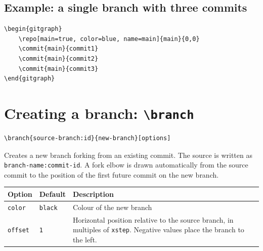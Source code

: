 \documentclass{article}
\newcommand{\cmd}[1]{\texttt{\textbackslash#1}}
\newcommand{\opt}[1]{\texttt{#1}}
\begin{document}
        \subsection{Example: a single branch with three commits}

            \begin{verbatim}
\begin{gitgraph}
    \repo[main=true, color=blue, name=main]{main}{0,0}
    \commit{main}{commit1}
    \commit{main}{commit2}
    \commit{main}{commit3}
\end{gitgraph}
            \end{verbatim}

            \begin{center}
                \begin{gitgraph}
                \end{gitgraph}
            \end{center}

    \section{Creating a branch: \cmd{branch}}

        \begin{verbatim}
\branch{source-branch:id}{new-branch}[options]
        \end{verbatim}

        Creates a new branch forking from an existing commit.
        The source is written as \texttt{branch-name:commit-id}.
        A fork elbow is drawn automatically from the source commit to the position of the first future commit on the new branch.

        \bigskip
        \begin{tabularx}{\textwidth}{llX}
            \hline
            \textbf{Option} & \textbf{Default} & \textbf{Description} \\
            \hline
            \opt{color}  & \opt{black} & Colour of the new branch \\
            \opt{offset} & \opt{1}     & Horizontal position relative to the source branch,
                                        in multiples of \opt{xstep}.
                                        Negative values place the branch to the left. \\
            \hline
        \end{tabularx}
\end{document}
